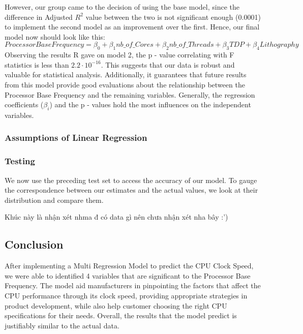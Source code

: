 
However, our group came to the decision of using the base model, since the difference in Adjusted $R^2$ value between the two is not significant enough (0.0001) to implement the second model as an improvement over the first. Hence, our final model now should look like this:\\

$Processor Base Frequency = \beta_0 + \beta_1 nb\_of\_Cores + \beta_2 nb\_of\_Threads + \beta_3 TDP + \beta_4 Lithography$ \\

Observing the results R gave on model 2, the p - value correlating with F statistics is less than $2.2 \cdot 10^{-16}$. This suggests that our data is robust and valuable for statistical analysis. Additionally, it guarantees that future results from this model provide good evaluations about the relationship between the Processor Base Frequency and the remaining variables. Generally, the regression coefficients ($\beta_i$) and the p - values hold the most influences on the independent variables. 

\subsubsection{Assumptions of Linear Regression}

\subsubsection{Testing}
We now use the preceding test set to access the accuracy of our model. To gauge the correspondence between our estimates and the actual values, we look at their distribution and compare them.


Khúc này là nhận xét nhma đ có data gì nên chưa nhận xét nha bây :')

\subsection{Conclusion}
After implementing a Multi Regression Model to predict the CPU Clock Speed, we were able to identified 4 variables that are significant to the Processor Base Frequency. The model aid manufacturers in pinpointing the factors that affect the CPU performance through its clock speed, providing appropriate strategies in product development, while also help customer choosing the right CPU specifications for their needs. Overall, the results that the model predict is justifiably similar to the actual data. 

\newpage
